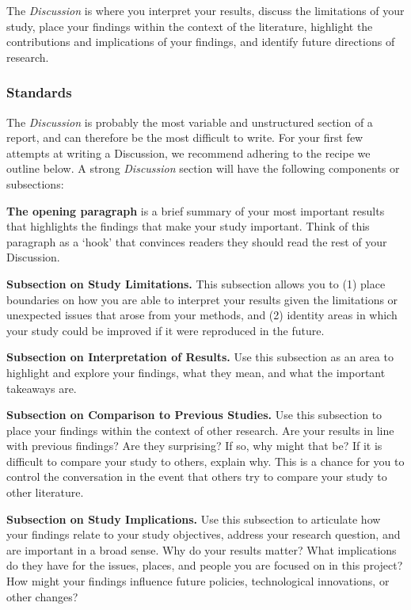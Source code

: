 \documentclass[]{book}
\begin{document}
The \emph{Discussion} is where you interpret your results, discuss the limitations of your study, place your findings within the context of the literature, highlight the contributions and implications of your findings, and identify future directions of research.

\hypertarget{standards-4}{%
\subsubsection*{Standards}\label{standards-4}}

The \emph{Discussion} is probably the most variable and unstructured section of a report, and can therefore be the most difficult to write. For your first few attempts at writing a Discussion, we recommend adhering to the recipe we outline below. A strong \emph{Discussion} section will have the following components or subsections:

\textbf{The opening paragraph} is a brief summary of your most important results that highlights the findings that make your study important. Think of this paragraph as a `hook' that convinces readers they should read the rest of your Discussion.

\textbf{Subsection on Study Limitations.} This subsection allows you to (1) place boundaries on how you are able to interpret your results given the limitations or unexpected issues that arose from your methods, and (2) identity areas in which your study could be improved if it were reproduced in the future.

\textbf{Subsection on Interpretation of Results.} Use this subsection as an area to highlight and explore your findings, what they mean, and what the important takeaways are.

\textbf{Subsection on Comparison to Previous Studies.} Use this subsection to place your findings within the context of other research. Are your results in line with previous findings? Are they surprising? If so, why might that be? If it is difficult to compare your study to others, explain why. This is a chance for you to control the conversation in the event that others try to compare your study to other literature.

\textbf{Subsection on Study Implications.} Use this subsection to articulate how your findings relate to your study objectives, address your research question, and are important in a broad sense. Why do your results matter? What implications do they have for the issues, places, and people you are focused on in this project? How might your findings influence future policies, technological innovations, or other changes?
\end{document}
